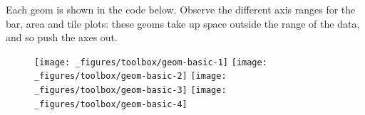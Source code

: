 Each geom is shown in the code below. Observe the different axis ranges
for the bar, area and tile plots: these geoms take up space outside the
range of the data, and so push the axes out.

\begin{Shaded}
\begin{Highlighting}[]
\StringTok{ }\NormalTok{(}
   \NormalTok{(}\NormalTok{, }\NormalTok{, }\NormalTok{), }
   \NormalTok{(}\NormalTok{, }\NormalTok{, }\NormalTok{), }
   \NormalTok{(}\NormalTok{,}\NormalTok{,}\NormalTok{)}
\NormalTok{)}
\StringTok{ } \StringTok{ }
\StringTok{  }\NormalTok{(} \NormalTok{, } \NormalTok{) +}\StringTok{ }
\StringTok{  }\NormalTok{(} \NormalTok{(} \NormalTok{)) }
\StringTok{ }\NormalTok{() +}\StringTok{ }\NormalTok{(}\NormalTok{)}
\StringTok{ }\NormalTok{() +}\StringTok{ }\NormalTok{(}\NormalTok{)}
\StringTok{ }\NormalTok{(} \NormalTok{) +}\StringTok{ }\NormalTok{(}\NormalTok{)}
\StringTok{ }\NormalTok{() +}\StringTok{ }\NormalTok{(}\NormalTok{)}
\end{Highlighting}
\end{Shaded}

\begin{figure}[H]
  \texttt{[image: \_figures/toolbox/geom-basic-1]}%
  \texttt{[image: \_figures/toolbox/geom-basic-2]}%
  \texttt{[image: \_figures/toolbox/geom-basic-3]}%
  \texttt{[image: \_figures/toolbox/geom-basic-4]}
\end{figure}

\begin{Shaded}
\begin{Highlighting}[]
\StringTok{ }\NormalTok{() +}\StringTok{ }\NormalTok{(}\NormalTok{)}
\StringTok{ }\NormalTok{() +}\StringTok{ }\NormalTok{(}\NormalTok{)}
\StringTok{ }\NormalTok{() +}\StringTok{ }\NormalTok{(}\NormalTok{)}
\StringTok{ }\NormalTok{() +}\StringTok{ }\NormalTok{(}\NormalTok{)}
\end{Highlighting}
\end{Shaded}


